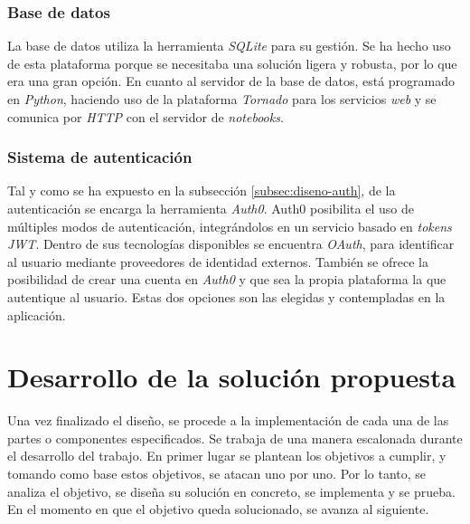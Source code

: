 \documentclass[11pt,spanish,listoffigures]{tfgetsinf}
\begin{document}
\subsection{Base de datos}
\label{subsec:tecno-DB}

La base de datos utiliza la herramienta \textit{SQLite} para su gestión. Se ha hecho uso de esta plataforma porque se necesitaba una solución ligera y robusta, por lo que era una gran opción. En cuanto al servidor de la base de datos, está programado en \textit{Python}, haciendo uso de la plataforma \textit{Tornado} para los servicios \textit{web} y se comunica por \textit{HTTP} con el servidor de \textit{notebooks}.


\subsection{Sistema de autenticación}
\label{subsec:tecno-auth}

Tal y como se ha expuesto en la subsección \ref{subsec:diseno-auth}, de la autenticación se encarga la herramienta \textit{Auth0}. Auth0 posibilita el uso de múltiples modos de autenticación, integrándolos en un servicio basado en \textit{tokens} \textit{JWT}. Dentro de sus tecnologías disponibles se encuentra \textit{OAuth}, para identificar al usuario mediante proveedores de identidad externos. También se ofrece la posibilidad de crear una cuenta en \textit{Auth0} y que sea la propia plataforma la que autentique al usuario. Estas dos opciones son las elegidas y contempladas en la aplicación.





\chapter{Desarrollo de la solución propuesta}
\label{ch:desarrollo-solucion}

Una vez finalizado el diseño, se procede a la implementación de cada una de las partes o componentes especificados. Se trabaja de una manera escalonada durante el desarrollo del trabajo. En primer lugar se plantean los objetivos a cumplir, y tomando como base estos objetivos, se atacan uno por uno. Por lo tanto, se analiza el objetivo, se diseña su solución en concreto, se implementa y se prueba. En el momento en que el objetivo queda solucionado, se avanza al siguiente.
\end{document}
